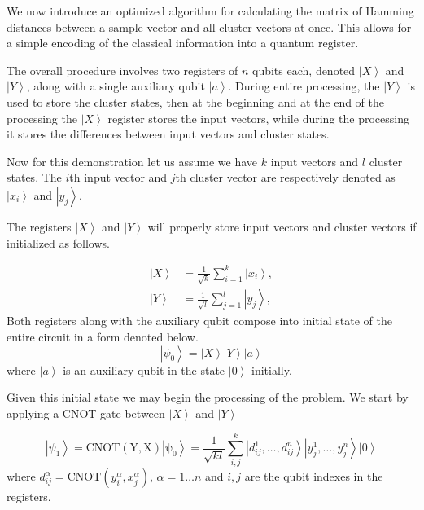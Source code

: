 \documentclass[pra,showkeys,twocolumn,showpacs]{revtex4-1}
\begin{document}
We now introduce an optimized algorithm for calculating the matrix of Hamming distances \cite{trugenberger2001} between a sample vector and all cluster vectors at once.  This allows for a simple encoding of the classical information into a quantum register.

The overall procedure involves two registers of $n$ qubits each, denoted $\left| X \right\rangle$ and $\left| Y \right\rangle$, along with a single auxiliary qubit $\left| a \right\rangle$. During entire processing, the $\left| Y \right\rangle$ is used to store the cluster states, then at the beginning and at the end of the processing the $\left| X \right\rangle$ register stores the input vectors, while during the processing it stores the differences between input vectors and cluster states.

Now for this demonstration let us assume we have $k$ input vectors and $l$ cluster states. The $i$th input vector and $j$th cluster vector are respectively denoted as $\left| x_i \right\rangle$ and $\left| y_j \right\rangle$.

The registers $\left| X \right\rangle$ and $\left| Y \right\rangle$ will properly store input vectors and cluster vectors if initialized as follows.

%
\begin{align}
    \left| X \right\rangle  & = \frac{1}{\sqrt{k}} \sum\limits_{i=1}^{k} \left| x_i \right\rangle,  \\
    \left| Y \right\rangle&  = \frac{1}{\sqrt{l}} \sum\limits_{j=1}^{l} \left| y_j \right\rangle,
    \label{eq:encodnig}
\end{align}
% 
Both registers along with the auxiliary qubit compose into initial state of the entire circuit in a form denoted below. 
%
\begin{equation} 
\left| \psi_0 \right\rangle = 
    \left| X \right\rangle
    \left| Y \right\rangle 
    \left| a \right\rangle
    \label{eq:initial_state}
\end{equation}
%
where $\left| a \right\rangle$ is an auxiliary qubit in the state $\left| 0 \right\rangle$ initially.

Given this initial state we may begin the processing of the problem. We start by applying a CNOT gate between $\left| X \right\rangle$ and $\left| Y \right\rangle$

\begin{equation}
    \left| \psi_1 \right\rangle = 
    \mathrm{CNOT(Y,X)\left| \psi_0 \right\rangle} =  
    \frac{1}{\sqrt{kl}} \sum\limits_{i, j}^{k} 
    \left| d^1_{ij}, \dots, d^n_{ij} \right\rangle 
    \left| y^1_j, \dots, y^n_j \right\rangle
    \left| 0 \right\rangle 
\end{equation}
where $d^\alpha_{ij} = \mathrm{CNOT}(y^\alpha_i, x^\alpha_j),\, \alpha = 1 \dots n$ and $i,j$ are the qubit indexes in the registers.
\end{document}
